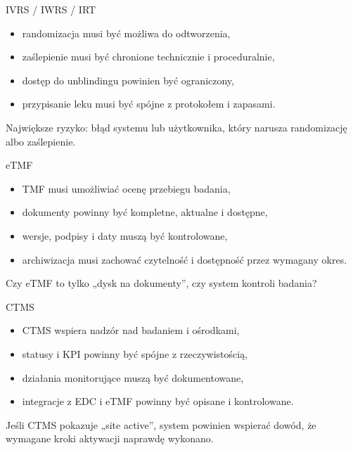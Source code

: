 \begin{frame}{IVRS / IWRS / IRT}
  \begin{itemize}
    \item randomizacja musi być możliwa do odtworzenia,
    \item zaślepienie musi być chronione technicznie i proceduralnie,
    \item dostęp do unblindingu powinien być ograniczony,
    \item przypisanie leku musi być spójne z protokołem i zapasami.
  \end{itemize}

  \vspace{0.3cm}

  \begin{WarningBox}
    Największe ryzyko: błąd systemu lub użytkownika, który narusza randomizację albo zaślepienie.
  \end{WarningBox}
\end{frame}

\begin{frame}{eTMF}
  \begin{itemize}
    \item TMF musi umożliwiać ocenę przebiegu badania,
    \item dokumenty powinny być kompletne, aktualne i dostępne,
    \item wersje, podpisy i daty muszą być kontrolowane,
    \item archiwizacja musi zachować czytelność i dostępność przez wymagany okres.
  \end{itemize}

  \vspace{0.3cm}

  \begin{QuestionBox}
    Czy eTMF to tylko „dysk na dokumenty”, czy system kontroli badania?
  \end{QuestionBox}
\end{frame}

\begin{frame}{CTMS}
  \begin{itemize}
    \item CTMS wspiera nadzór nad badaniem i ośrodkami,
    \item statusy i KPI powinny być spójne z rzeczywistością,
    \item działania monitorujące muszą być dokumentowane,
    \item integracje z EDC i eTMF powinny być opisane i kontrolowane.
  \end{itemize}

  \vspace{0.3cm}

  \begin{ExampleBox}
    Jeśli CTMS pokazuje „site active”, system powinien wspierać dowód, że wymagane kroki aktywacji naprawdę wykonano.
  \end{ExampleBox}
\end{frame}


